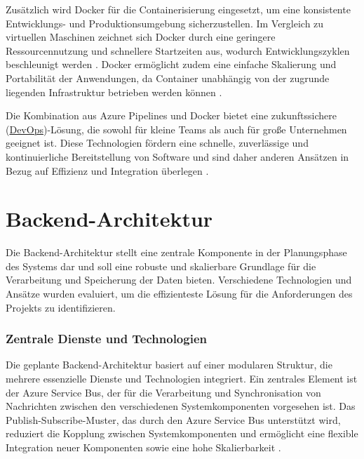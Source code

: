 Zusätzlich wird Docker für die Containerisierung eingesetzt, um eine konsistente \linebreak Entwicklungs- und Produktionsumgebung sicherzustellen. Im Vergleich zu virtuellen Maschinen zeichnet sich Docker durch eine geringere Ressourcennutzung und schnellere Startzeiten aus, wodurch Entwicklungszyklen beschleunigt werden \cite{dockerVsVm}. Docker ermöglicht zudem eine einfache Skalierung und Portabilität der Anwendungen, da Container unabhängig von der zugrunde liegenden Infrastruktur betrieben werden können \cite{dockerScalability}.

Die Kombination aus Azure Pipelines und Docker bietet eine zukunftssichere (\hyperref[abkuerzungen]{DevOps})-Lösung, die sowohl für kleine Teams als auch für große Unternehmen geeignet ist. Diese Technologien fördern eine schnelle, zuverlässige und kontinuierliche Bereitstellung von Software und sind daher anderen Ansätzen in Bezug auf Effizienz und Integration überlegen \cite{azureDockerIntegration}.

\section{Backend-Architektur} Die Backend-Architektur stellt eine zentrale Komponente in der Planungsphase des Systems dar und soll eine robuste und skalierbare Grundlage für die Verarbeitung und Speicherung der Daten bieten. Verschiedene Technologien und Ansätze wurden evaluiert, um die effizienteste Lösung für die Anforderungen des Projekts zu identifizieren.

\subsubsection*{Zentrale Dienste und Technologien} Die geplante Backend-Architektur basiert auf einer modularen Struktur, die mehrere essenzielle Dienste und Technologien integriert. Ein zentrales Element ist der Azure Service Bus, der für die Verarbeitung und Synchronisation von Nachrichten zwischen den verschiedenen Systemkomponenten vorgesehen ist. Das Publish-Subscribe-Muster, das durch den Azure Service Bus unterstützt wird, reduziert die Kopplung zwischen Systemkomponenten und ermöglicht eine flexible Integration neuer Komponenten sowie eine hohe Skalierbarkeit \cite{azureServiceBus2024}.



